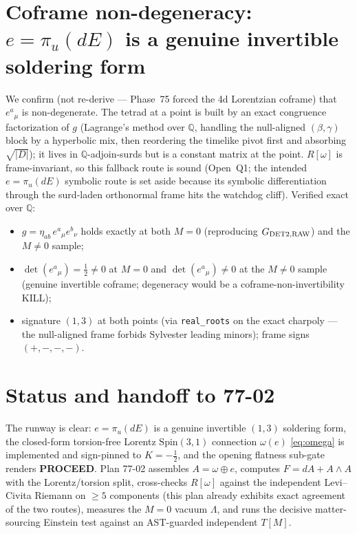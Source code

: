 \documentclass[11pt]{article}
\newcommand{\Q}{\mathbb{Q}}
\newcommand{\eu}{e}
\newcommand{\om}{\omega}
\theoremstyle{definition}\newtheorem{remark}{Remark}
\theoremstyle{plain}\newtheorem{proposition}{Proposition}
\begin{document}
\section{Coframe non-degeneracy: $e=\pi_u(dE)$ is a genuine invertible soldering form}
We confirm (not re-derive --- Phase~75 forced the 4d Lorentzian coframe) that $\eu^a{}_\mu$ is
non-degenerate. The tetrad at a point is built by an exact congruence factorization of $g$
(Lagrange's method over $\Q$, handling the null-aligned $(\beta,\gamma)$ block by a hyperbolic mix,
then reordering the timelike pivot first and absorbing $\sqrt{|D|}$); it lives in $\Q$-adjoin-surds
but is a constant matrix at the point. $R[\om]$ is frame-invariant, so this fallback route is sound
(Open~Q1; the intended $\eu=\pi_u(dE)$ symbolic route is set aside because its symbolic differentiation
through the surd-laden orthonormal frame hits the watchdog cliff). Verified exact over $\Q$:
\begin{itemize}
\item $g=\eta_{ab}\,\eu^a{}_\mu \eu^b{}_\nu$ holds exactly at both $M=0$ (reproducing $G_{\rm DET2,RAW}$)
and the $M\neq0$ sample;
\item $\det(\eu^a{}_\mu)=\tfrac12\neq0$ at $M=0$ and $\det(\eu^a{}_\mu)\neq0$ at the $M\neq0$ sample
(genuine invertible coframe; degeneracy would be a coframe-non-invertibility KILL);
\item signature $(1,3)$ at both points (via \texttt{real\_roots} on the exact charpoly --- the
null-aligned frame forbids Sylvester leading minors); frame signs $(+,-,-,-)$.
\end{itemize}

\section*{Status and handoff to 77-02}
The runway is clear: $\eu=\pi_u(dE)$ is a genuine invertible $(1,3)$ soldering form, the closed-form
torsion-free Lorentz $\mathrm{Spin}(3,1)$ connection $\om(e)$ \eqref{eq:omega} is implemented and
sign-pinned to $K=-\tfrac12$, and the opening flatness sub-gate renders \textbf{PROCEED}. Plan 77-02
assembles $A=\om\oplus\eu$, computes $F=dA+A\wedge A$ with the Lorentz/torsion split, cross-checks
$R[\om]$ against the independent Levi--Civita Riemann on $\geq5$ components (this plan already exhibits
exact agreement of the two routes), measures the $M=0$ vacuum $\Lambda$, and runs the decisive
matter-sourcing Einstein test against an AST-guarded independent $T[M]$.
\end{document}
